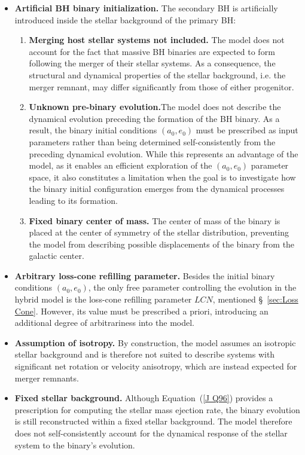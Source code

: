 \documentclass[12pt,twoside,openany]{book}
\begin{document}
\begin{itemize}
    \item \textbf{Artificial BH binary initialization.} The secondary BH is artificially introduced inside the stellar background of the primary BH:
    \begin{enumerate}
        \item \textbf{Merging host stellar systems not included.} The model does not account for the fact that massive BH binaries are expected to form following the merger of their stellar systems. As a consequence, the structural and dynamical properties of the stellar background, i.e. the merger remnant, may differ significantly from those of either progenitor.

        \item \textbf{Unknown pre-binary evolution.}The model does not describe the dynamical evolution preceding the formation of the BH binary. As a result, the binary initial conditions $(a_0,e_0)$ must be prescribed as input parameters rather than being determined self-consistently from the preceding dynamical evolution. While this represents an advantage of the model, as it enables an efficient exploration of the $(a_0,e_0)$ parameter space, it also constitutes a limitation when the goal is to investigate how the binary initial configuration emerges from the dynamical processes leading to its formation.

        \item \textbf{Fixed binary center of mass.} The center of mass of the binary is placed at the center of symmetry of the stellar distribution, preventing the model from describing possible displacements of the binary from the galactic center.
    \end{enumerate}

    \item \textbf{Arbitrary loss-cone refilling parameter.} Besides the initial binary conditions $(a_0,e_0)$, the only free parameter controlling the evolution in the hybrid model is the loss-cone refilling parameter $LCN$, mentioned \S~\ref{sec:Loss Cone}. However, its value must be prescribed a priori, introducing an additional degree of arbitrariness into the model.

    \item \textbf{Assumption of isotropy.} By construction, the model assumes an isotropic stellar background and is therefore not suited to describe systems with significant net rotation or velocity anisotropy, which are instead expected for merger remnants.

    \item \textbf{Fixed stellar background.} Although Equation~(\ref{J Q96}) provides a prescription for computing the stellar mass ejection rate, the binary evolution is still reconstructed within a fixed stellar background. The model therefore does not self-consistently account for the dynamical response of the stellar system to the binary's evolution.
\end{itemize}
\end{document}
